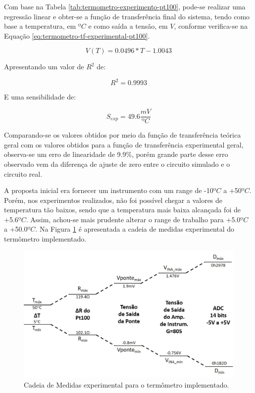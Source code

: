 \documentclass[a4paper]{instrumentacao}
\begin{document}
Com base na Tabela \ref{tab:termometro-experimento-pt100}, pode-se realizar uma regressão linear e obter-se a função de transferência final do sistema, tendo como base a temperatura, em $ºC$ e como saída a tensão, em $V$, conforme verifica-se na Equação \ref{eq:termometro-tf-experimental-pt100}.

\begin{equation}
	V(T)=0.0496*T-1.0043
	\label{eq:termometro-tf-experimental-pt100}
\end{equation}

Apresentando um valor de $R^2$ de:

\begin{equation}
	R^2=0.9993
	\label{eq:termometro-r2-tf-experimental-pt100}
\end{equation}

E uma sensibilidade de:

\begin{equation}
	S_{exp}=49.6\frac{mV}{ºC}
	\label{eq:termometro-sensibilidade-experimental-pt100}
\end{equation}

Comparando-se os valores obtidos por meio da função de transferência teórica geral com os valores obtidos para a função de transferência experimental geral, observa-se um erro de linearidade de 9.9$\%$, porém grande parte desse erro observado vem da diferença de ajuste de zero entre o circuito simulado e o circuito real.

A proposta inicial era fornecer um instrumento com um range de -10$ºC$ a +50$ºC$. Porém, nos experimentos realizados, não foi possível chegar a valores de temperatura tão baixos, sendo que a temperatura mais baixa alcançada foi de +5.6$ºC$. Assim, achou-se mais prudente alterar o range de trabalho para +5.0$ºC$ a +50.0$ºC$. Na Figura \ref{fig:termometro-cadeia-medidas-experimental} é apresentada a cadeia de medidas experimental do termômetro implementado.

\begin{figure}[H]
	\centering \includegraphics[width=\textwidth]{termometro-cadeia-medidas-experimental.jpg}
	\caption{Cadeia de Medidas experimental para o termômetro implementado.}
	\label{fig:termometro-cadeia-medidas-experimental}
\end{figure}
\end{document}
